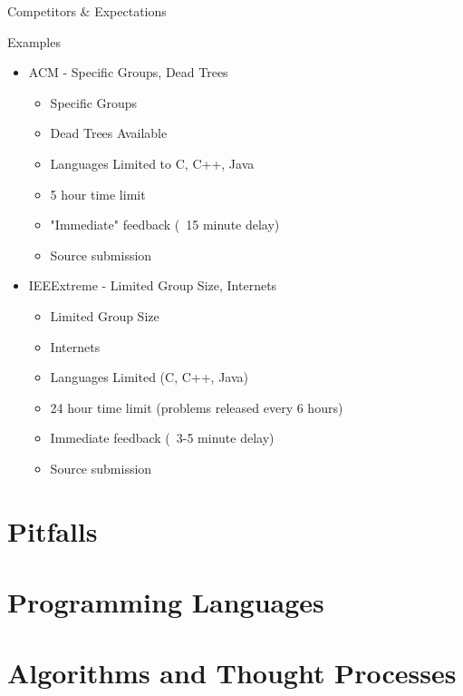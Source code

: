 \documentclass{beamer}
\begin{document}
\begin{frame}{Competitors \& Expectations}

\end{frame}

\begin{frame}{Examples}
  \begin{centering}
    \begin{itemize}
      \item ACM - Specific Groups, Dead Trees
      \begin{itemize}
        \item Specific Groups
        \item Dead Trees Available
        \item Languages Limited to C, C++, Java
        \item 5 hour time limit
        \item "Immediate" feedback (~15 minute delay)
        \item Source submission
      \end{itemize}
      \pause
      \item IEEExtreme - Limited Group Size, Internets
      \begin{itemize}
        \item Limited Group Size
        \item Internets
        \item Languages Limited (C, C++, Java)
        \item 24 hour time limit (problems released every 6 hours)
        \item Immediate feedback (~3-5 minute delay)
        \item Source submission
      \end{itemize}
    \end{itemize}
  \end{centering}
\end{frame}

  
  

\section{Pitfalls}

\section{Programming Languages}

\section{Algorithms and Thought Processes}
\end{document}
